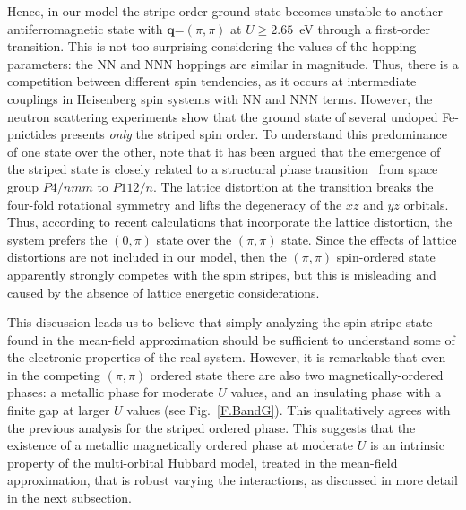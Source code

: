 \documentclass[aps,prb,superscriptaddress,preprintnumbers,
showpacs,legalpaper,twoside,twocolumn,amsmath,amssymb]{revtex4}
\begin{document}
Hence, in our model the stripe-order ground state becomes unstable to
another antiferromagnetic state with $\mathbf{q}$=$(\pi,\pi)$ at
$U\geqslant2.65$~eV through a first-order transition. This is not too
surprising considering the values of the hopping parameters: the NN
and NNN hoppings are similar in magnitude. Thus, there is a competition
between different spin tendencies, as it occurs at intermediate couplings
in Heisenberg spin systems with
NN and NNN terms.
%
However, the neutron scattering experiments
show that the ground state of several undoped Fe-pnictides presents {\it only} the
striped spin order. To understand this predominance of one state
over the other, note that it has been argued that the emergence of the striped state is
closely related to a structural phase
transition~\cite{neutrons1,neutrons2} from space group $P4/nmm$ to
$P112/n$. The lattice distortion at the
transition breaks the four-fold rotational symmetry and lifts the
degeneracy of the $xz$  and $yz$ orbitals. Thus, according to recent
calculations that incorporate the lattice distortion, the system prefers the
$(0,\pi)$ state over the $(\pi,\pi)$ state.\cite{yildirim}
Since the effects of lattice distortions are not
included in our model, then the $(\pi,\pi)$ spin-ordered state
apparently strongly competes with the spin stripes, but this is misleading
and caused by the absence of lattice energetic considerations.

This discussion leads us to believe that simply analyzing the
spin-stripe state found in the mean-field approximation should be sufficient
to understand some of the electronic properties of the real system. However,
it is remarkable that even in the competing $(\pi,\pi)$
ordered state there are also two magnetically-ordered phases: a metallic phase for
moderate $U$ values, and an insulating phase with a finite gap at
larger $U$ values (see Fig.~\ref{F.BandG}).
This qualitatively agrees with the previous analysis
for the striped ordered phase. This suggests that the existence of
a metallic magnetically ordered phase at moderate $U$ is
an intrinsic property of the multi-orbital Hubbard model, treated in the mean-field
approximation, that is robust
varying the interactions, as discussed in more detail in the next subsection.
\end{document}
